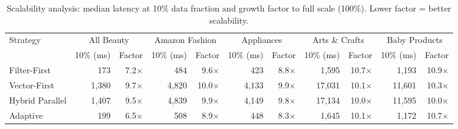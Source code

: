 \begin{table}[ht]
\centering
\small
\begin{tabular}{lrrrrrrrrrr}
\hline
Strategy & \multicolumn{2}{c}{All Beauty} & \multicolumn{2}{c}{Amazon Fashion} & \multicolumn{2}{c}{Appliances} & \multicolumn{2}{c}{Arts \& Crafts} & \multicolumn{2}{c}{Baby Products} \\
 & 10\% (ms) & Factor & 10\% (ms) & Factor & 10\% (ms) & Factor & 10\% (ms) & Factor & 10\% (ms) & Factor \\
\hline
Filter-First & 173 & 7.2$\times$ & 484 & 9.6$\times$ & 423 & 8.8$\times$ & 1,595 & 10.7$\times$ & 1,193 & 10.9$\times$ \\
Vector-First & 1,380 & 9.7$\times$ & 4,820 & 10.0$\times$ & 4,133 & 9.9$\times$ & 17,031 & 10.1$\times$ & 11,601 & 10.3$\times$ \\
Hybrid Parallel & 1,407 & 9.5$\times$ & 4,839 & 9.9$\times$ & 4,149 & 9.8$\times$ & 17,134 & 10.0$\times$ & 11,595 & 10.0$\times$ \\
Adaptive & 199 & 6.5$\times$ & 508 & 8.9$\times$ & 448 & 8.3$\times$ & 1,645 & 10.1$\times$ & 1,172 & 10.7$\times$ \\
\hline
\end{tabular}
\caption{Scalability analysis: median latency at 10\% data fraction and growth factor to full scale (100\%). Lower factor = better scalability.}
\label{tab:scalability}
\end{table}